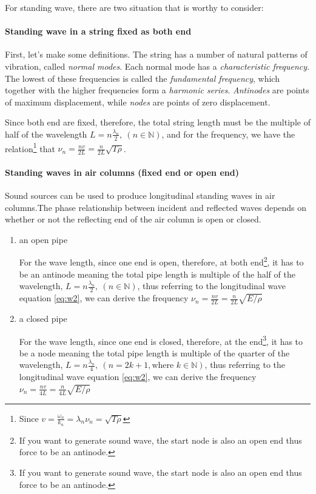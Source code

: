 \documentclass[openany]{book}
\begin{document}
For standing wave, there are two situation that is worthy to consider:

\paragraph{Standing wave in a string fixed as both end }

First, let's make some definitions. The string has a number of natural patterns of vibration, called \emph{normal modes}. Each normal mode has a \emph{characteristic frequency}. The lowest of these frequencies is called the \emph{fundamental frequency}, which together with the higher frequencies form a \emph{harmonic series}. \emph{Antinodes} are points of maximum displacement, while
\emph{nodes} are points of zero displacement.

Since both end are fixed, therefore, the total string length must be the multiple of half of the wavelength $L=n\frac{\lambda _n}{2},\ (n\in \mathbb{N})$, and for the frequency, we have the relation\footnote{Since $v=\frac{\omega _n}{k_n}=\lambda _n\nu _n=\sqrt{T\rho }$} that $\nu _n=\frac{nv}{2L}=\frac{n}{2L}\sqrt{T\rho }$.

\paragraph{Standing waves in air columns (fixed end or open end)} 
Sound sources can be used to produce longitudinal standing waves in air columns.The phase relationship between incident and reflected waves depends on whether or not the reflecting end of the air column is open or closed.
\begin{enumerate}
\item an open pipe

For the wave length, since one end is open, therefore, at both end\footnote{If you want to generate sound wave, the start node is also an open end thus force to be an antinode.}, it has to be an antinode meaning the total pipe length is multiple of the half of the wavelength, $L=n\frac{\lambda _n}{2},\ (n\in \mathbb{N})$, thus referring to the longitudinal wave equation \eqref{eq:w2}, we can derive the frequency $\nu _n=\frac{nv}{2L}=\frac{n}{2L}\sqrt{E/\rho }$
\item a closed pipe

For the wave length, since one end is closed, therefore, at the end\footnote{If you want to generate sound wave, the start node is also an open end thus force to be an antinode.}, it has to be a node meaning the total pipe length is multiple of the quarter of the wavelength, $L=n\frac{\lambda _n}{4},\ (n=2k+1, \text{where }k\in \mathbb{N})$, thus referring to the longitudinal wave equation \eqref{eq:w2}, we can derive the frequency $\nu _n=\frac{nv}{4L}=\frac{n}{4L}\sqrt{E/\rho }$
\end{enumerate}
\end{document}
